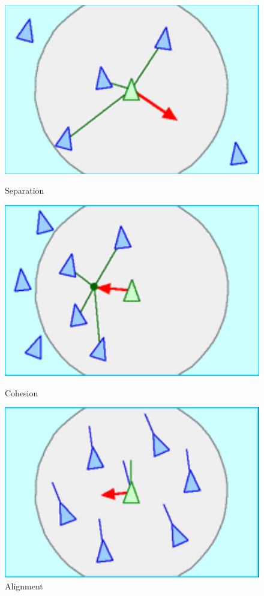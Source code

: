 \documentclass[a4paper, 12pt]{book}
\begin{document}
\begin{figure}[!htb]
  \includegraphics[width=\linewidth]{Images/separation.png}
  \caption{Separation}\label{fig:image1}
\endminipage\hfill
{}
  \includegraphics[width=\linewidth]{Images/cohesion.png}
  \caption{Cohesion}\label{fig:image2}
\endminipage\hfill
{}%
  \includegraphics[width=\linewidth]{Images/alignment.png}
  \caption{Alignment}\label{fig:image3}
\endminipage
\label{pic5}
\end{figure}
\end{document}
